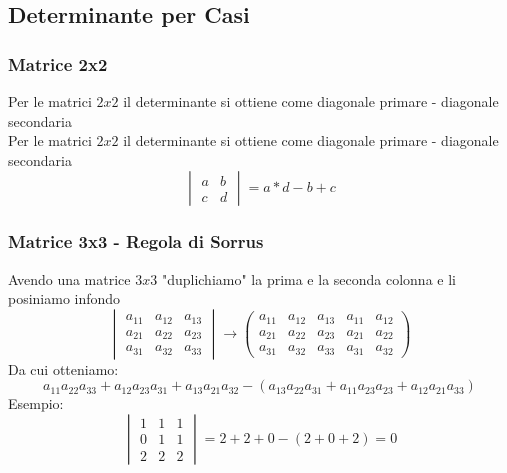 \subsection{Determinante per Casi}

\subsubsection{Matrice 2x2}
Per le matrici $2x2$ il determinante si ottiene come diagonale primare - diagonale secondaria\\
Per le matrici $2x2$ il determinante si ottiene come diagonale primare - diagonale secondaria\\
\begin{equation}
\begin{vmatrix}
a & b \\
c & d
\end{vmatrix}
= a*d - b+c
\end{equation}

\subsubsection{Matrice 3x3 - Regola di Sorrus}
Avendo una matrice $3x3$ "duplichiamo" la prima e la seconda colonna  e li posiniamo infondo
$$
\begin{vmatrix}
a_{11} & a_{12} & a_{13}\\
a_{21} & a_{22} & a_{23}\\
a_{31} & a_{32} & a_{33}
\end{vmatrix}
\rightarrow
\begin{pmatrix}
a_{11} & a_{12} & a_{13} & a_{11} & a_{12}\\
a_{21} & a_{22} & a_{23} & a_{21} & a_{22}\\
a_{31} & a_{32} & a_{33} & a_{31} & a_{32}
\end{pmatrix}
$$
Da cui otteniamo:
$$ a_{11}a_{22}a_{33} + a_{12}a_{23}a_{31} + a_{13}a_{21}a_{32} - (a_{13}a_{22}a_{31} + a_{11}a_{23}a_{23} + a_{12}a_{21}a_{33})$$
Esempio:
$$ 
\begin{vmatrix}
1 & 1 & 1 \\
0 & 1 & 1 \\
2 & 2 & 2
\end{vmatrix}
= 2+2+0-(2+0+2) = 0
$$

